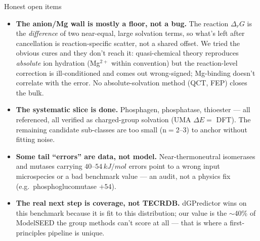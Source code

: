 \documentclass[aspectratio=169,11pt]{beamer}
\newcommand{\kj}{\,kJ/mol}
\begin{document}
\begin{frame}{Honest open items}
  \begin{itemize}
    \item \textbf{The anion/Mg wall is mostly a floor, not a bug.} The reaction $\Delta_r G$ is the
    \emph{difference} of two near-equal, large solvation terms, so what's left after cancellation is
    reaction-specific scatter, not a shared offset. We tried the obvious cures and they don't reach it:
    quasi-chemical theory reproduces \emph{absolute} ion hydration (Mg$^{2+}$ within convention) but the
    reaction-level correction is ill-conditioned and comes out wrong-signed; Mg-binding doesn't correlate
    with the error. No absolute-solvation method (QCT, FEP) closes the bulk.
    \item \textbf{The systematic slice is done.} Phosphagen, phosphatase, thioester --- all referenced,
    all verified as charged-group solvation (UMA $\Delta E =$ DFT). The remaining candidate sub-classes
    are too small (n$=$2--3) to anchor without fitting noise.
    \item \textbf{Some tail ``errors'' are data, not model.} Near-thermoneutral isomerases and mutases
    carrying $40$--$54\kj$ errors point to a wrong input microspecies or a bad benchmark value --- an
    audit, not a physics fix (e.g.\ phosphoglucomutase $+54$).
    \item \textbf{The real next step is coverage, not TECRDB.} dGPredictor wins on this benchmark
    because it is fit to this distribution; our value is the $\sim$40\% of ModelSEED the group methods
    can't score at all --- that is where a first-principles pipeline is unique.
  \end{itemize}
\end{frame}
\end{document}
